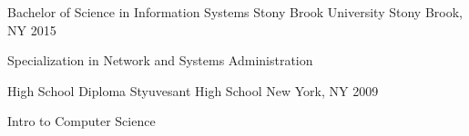 


\begin{cventries}


\cventry
{Bachelor of Science in Information Systems} %
{Stony Brook University} %
{Stony Brook, NY} %
{2015} %
{ %
\begin{cvitems}
\item {Specialization in Network and Systems Administration}
\end{cvitems}
}


\cventry
{High School Diploma} %
{Styuvesant High School} %
{New York, NY} %
{2009} %
{ %
\begin{cvitems}
\item {Intro to Computer Science}
\end{cvitems}
}


\end{cventries}
